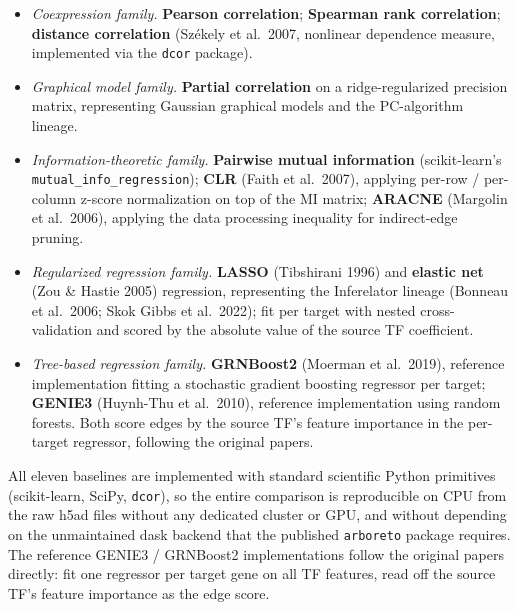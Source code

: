 \documentclass[11pt,letterpaper]{article}
\begin{document}
\begin{itemize}[leftmargin=2em]
\item \textit{Coexpression family.}
  \textbf{Pearson correlation}; \textbf{Spearman rank correlation};
  \textbf{distance correlation} (Sz\'ekely et al.\ 2007, nonlinear
  dependence measure, implemented via the \texttt{dcor} package).
\item \textit{Graphical model family.}
  \textbf{Partial correlation} on a ridge-regularized precision matrix,
  representing Gaussian graphical models and the PC-algorithm lineage.
\item \textit{Information-theoretic family.}
  \textbf{Pairwise mutual information} (scikit-learn's
  \texttt{mutual\_info\_regression}); \textbf{CLR} (Faith et al.\ 2007),
  applying per-row / per-column z-score normalization on top of the MI
  matrix; \textbf{ARACNE} (Margolin et al.\ 2006), applying the data
  processing inequality for indirect-edge pruning.
\item \textit{Regularized regression family.}
  \textbf{LASSO} (Tibshirani 1996) and \textbf{elastic net} (Zou \&
  Hastie 2005) regression, representing the Inferelator lineage
  (Bonneau et al.\ 2006; Skok Gibbs et al.\ 2022); fit per target with
  nested cross-validation and scored by the absolute value of the source
  TF coefficient.
\item \textit{Tree-based regression family.}
  \textbf{GRNBoost2} (Moerman et al.\ 2019), reference implementation
  fitting a stochastic gradient boosting regressor per target;
  \textbf{GENIE3} (Huynh-Thu et al.\ 2010), reference implementation
  using random forests. Both score edges by the source TF's feature
  importance in the per-target regressor, following the original papers.
\end{itemize}

All eleven baselines are implemented with standard scientific Python
primitives (scikit-learn, SciPy, \texttt{dcor}), so the entire comparison
is reproducible on CPU from the raw h5ad files without any dedicated
cluster or GPU, and without depending on the unmaintained dask backend
that the published \texttt{arboreto} package requires. The reference
GENIE3 / GRNBoost2 implementations follow the original papers directly:
fit one regressor per target gene on all TF features, read off the source
TF's feature importance as the edge score.
\end{document}
